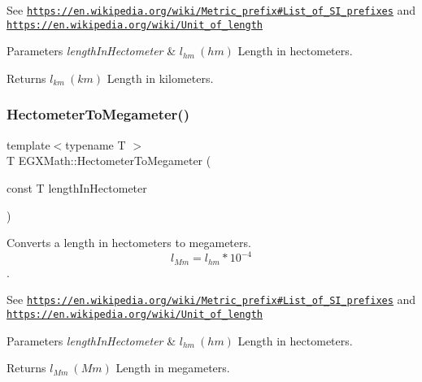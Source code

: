See \href{https://en.wikipedia.org/wiki/Metric_prefix#List_of_SI_prefixes}{\tt https\+://en.\+wikipedia.\+org/wiki/\+Metric\+\_\+prefix\#\+List\+\_\+of\+\_\+\+S\+I\+\_\+prefixes} and \href{https://en.wikipedia.org/wiki/Unit_of_length}{\tt https\+://en.\+wikipedia.\+org/wiki/\+Unit\+\_\+of\+\_\+length} 
\begin{DoxyParams}{Parameters}
{\em length\+In\+Hectometer} & $ l_{hm}\ (hm)$ Length in hectometers. \\
\hline
\end{DoxyParams}
\begin{DoxyReturn}{Returns}
$ l_{km}\ (km)$ Length in kilometers. 
\end{DoxyReturn}
\mbox{\label{group___e_g_x_math-_conversions-_length_conversions-_hectometer-_s_i_gab1a836041f9b5851f1b51fa4a09c6791}} 
\subsubsection{\texorpdfstring{Hectometer\+To\+Megameter()}{HectometerToMegameter()}}
{\footnotesize\ttfamily template$<$typename T $>$ \\
T E\+G\+X\+Math\+::\+Hectometer\+To\+Megameter (\begin{DoxyParamCaption}\item[{const T}]{length\+In\+Hectometer }\end{DoxyParamCaption})}



Converts a length in hectometers to megameters. \[ l_{Mm}=l_{hm} * 10^{-4} \]. 

See \href{https://en.wikipedia.org/wiki/Metric_prefix#List_of_SI_prefixes}{\tt https\+://en.\+wikipedia.\+org/wiki/\+Metric\+\_\+prefix\#\+List\+\_\+of\+\_\+\+S\+I\+\_\+prefixes} and \href{https://en.wikipedia.org/wiki/Unit_of_length}{\tt https\+://en.\+wikipedia.\+org/wiki/\+Unit\+\_\+of\+\_\+length} 
\begin{DoxyParams}{Parameters}
{\em length\+In\+Hectometer} & $ l_{hm}\ (hm)$ Length in hectometers. \\
\hline
\end{DoxyParams}
\begin{DoxyReturn}{Returns}
$ l_{Mm}\ (Mm)$ Length in megameters. 
\end{DoxyReturn}
\mbox{\label{group___e_g_x_math-_conversions-_length_conversions-_hectometer-_s_i_ga785d53e7a9f74e669376b22db1acca4b}} 
